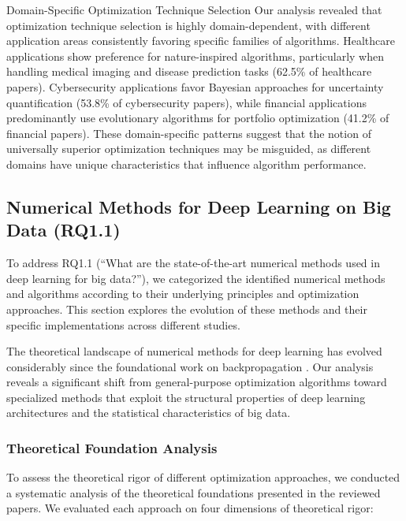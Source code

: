 \documentclass[acmsmall]{acmart}
\begin{document}
\begin{themebox}{Domain-Specific Optimization Technique Selection}
    Our analysis revealed that optimization technique selection is highly domain-dependent, with different application areas consistently favoring specific families of algorithms. Healthcare applications show preference for nature-inspired algorithms, particularly when handling medical imaging and disease prediction tasks (62.5\% of healthcare papers). Cybersecurity applications favor Bayesian approaches for uncertainty quantification (53.8\% of cybersecurity papers), while financial applications predominantly use evolutionary algorithms for portfolio optimization (41.2\% of financial papers). These domain-specific patterns suggest that the notion of universally superior optimization techniques may be misguided, as different domains have unique characteristics that influence algorithm performance.
\end{themebox}

\subsection{Numerical Methods for Deep Learning on Big Data (RQ1.1)}\label{subsec:numerical-methods-for-deep-learning-on-big-data-rq11}
To address RQ1.1 (``What are the state-of-the-art numerical methods used in deep learning for big data?''), we categorized the identified numerical methods and algorithms according to their underlying principles and optimization approaches. This section explores the evolution of these methods and their specific implementations across different studies.

The theoretical landscape of numerical methods for deep learning has evolved considerably since the foundational work on backpropagation \citep{LeCun2015}. Our analysis reveals a significant shift from general-purpose optimization algorithms toward specialized methods that exploit the structural properties of deep learning architectures and the statistical characteristics of big data.

\subsubsection{Theoretical Foundation Analysis}\label{subsubsec:numerical-methods-for-deep-learning-on-big-data-rq11:theoretical-foundation-analysis}
To assess the theoretical rigor of different optimization approaches, we conducted a systematic analysis of the theoretical foundations presented in the reviewed papers. We evaluated each approach on four dimensions of theoretical rigor:
\end{document}
